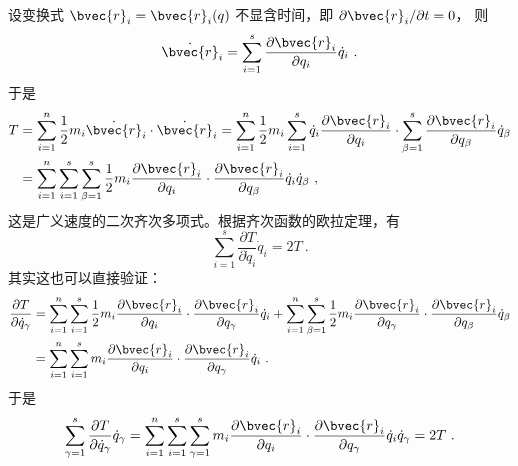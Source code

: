 设变换式 $\bvec{r}_{i}=\bvec{r}_{i}(q)$ 不显含时间，即 $\partial \bvec{r}_{i} / \partial t=0$， 则
\begin{equation}
\dot{\bvec{r}}_{i}=\sum_{i=1}^{s} \frac{\partial \bvec{r}_{i}}{\partial q_{i}} \dot{q}_{i}~.
\end{equation}
于是
\begin{equation}
\begin{aligned} T &=\sum_{i=1}^{n} \frac{1}{2} m_{i} \dot{\bvec{r}}_{i} \cdot \dot{\bvec{r}}_{i}=\sum_{i=1}^{n} \frac{1}{2} m_{i} \sum_{i=1}^{s} \dot{q}_{i} \frac{\partial \bvec{r}_{i}}{\partial q_{i}} \cdot \sum_{\beta=1}^{s} \frac{\partial \bvec{r}_{i}}{\partial q_{\beta}} \dot{q}_{\beta} \\ &=\sum_{i=1}^{n} \sum_{i=1}^{s} \sum_{\beta=1}^{s} \frac{1}{2} m_{i} \frac{\partial \bvec{r}_{i}}{\partial q_{i}} \cdot \frac{\partial \bvec{r}_{i}}{\partial q_{\beta}} \dot{q}_{i} \dot{q}_{\beta}~, \end{aligned}
\end{equation}
这是广义速度的二次齐次多项式。根据齐次函数的欧拉定理，有
\begin{equation} \label{eq_motint_3}
\sum_{i=1}^{s} \frac{\partial T}{\partial \dot{q}_{i}} \dot{q}_{i}=2 T~.
\end{equation}
其实这也可以直接验证：
\begin{equation}
\begin{aligned} \frac{\partial T}{\partial \dot{q}_{\gamma}} &=\sum_{i=1}^{n} \sum_{i=1}^{s} \frac{1}{2} m_{i} \frac{\partial \bvec{r}_{i}}{\partial q_{i}} \cdot \frac{\partial \bvec{r}_{i}}{\partial q_{\gamma}} \dot{q}_{i}+\sum_{i=1}^{n} \sum_{\beta=1}^{s} \frac{1}{2} m_{i} \frac{\partial \bvec{r}_{i}}{\partial q_{\gamma}} \cdot \frac{\partial \bvec{r}_{i}}{\partial q_{\beta}} \dot{q}_{\beta} \\ &=\sum_{i=1}^{n} \sum_{i=1}^{s} m_{i} \frac{\partial \bvec{r}_{i}}{\partial q_{i}} \cdot \frac{\partial \bvec{r}_{i}}{\partial q_{\gamma}} \dot{q}_{i} ~.\end{aligned}
\end{equation}
于是
\begin{equation}
\sum_{\gamma=1}^{s} \frac{\partial T}{\partial \dot{q}_{\gamma}} \dot{q}_{\gamma}=\sum_{i=1}^{n} \sum_{i=1}^{s} \sum_{\gamma=1}^{s} m_{i} \frac{\partial \bvec{r}_{i}}{\partial q_{i}} \cdot \frac{\partial \bvec{r}_{i}}{\partial q_{\gamma}} \dot{q}_{i} \dot{q}_{\gamma}=2 T~.
\end{equation}

